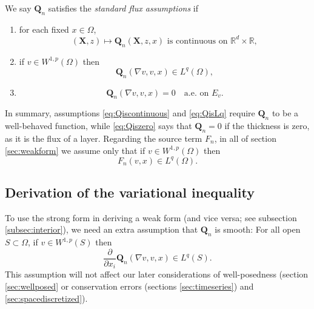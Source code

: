 \documentclass[final,leqno,onefignum,onetabnum]{siamltex1213bueler}
\newcommand\bQ{\mathbf{Q}}
\newcommand\bX{\mathbf{X}}
\renewcommand{\grad}{\nabla}
\newcommand\RR{\mathbb{R}}
\begin{document}
\begin{definition}  \label{ass:std}  We say $\bQ_n$ satisfies the \emph{standard flux assumptions} if
\renewcommand{\labelenumi}{\emph{\roman{enumi}})}
\begin{enumerate}
\item for each fixed $x\in \Omega$,
\begin{equation}
(\bX,z) \mapsto \bQ_n(\bX,z,x) \text{ is continuous on } \RR^d \times \RR,  \label{eq:Qiscontinuous}
\end{equation}
\item if $v \in W^{1,p}(\Omega)$ then
\begin{equation}
\bQ_n(\grad v,v,x) \in L^q(\Omega), \label{eq:QisLq}
\end{equation}
\item
\begin{equation}
\bQ_n(\grad v,v,x)=0 \quad \text{a.e.~on } E_v. \label{eq:Qiszero}
\end{equation}
\end{enumerate}
\end{definition}

In summary, assumptions \eqref{eq:Qiscontinuous} and \eqref{eq:QisLq} require $\bQ_n$ to be a well-behaved function, while \eqref{eq:Qiszero} says that $\bQ_n=0$ if the thickness is zero, as it is the flux of a layer.  Regarding the source term $F_n$, in all of section \ref{sec:weakform} we assume only that if $v\in W^{1,p}(\Omega)$ then
\begin{equation}
F_n(v,x) \in L^q(\Omega).  \label{eq:FisLq}
\end{equation}

\subsection{Derivation of the variational inequality}  \label{subsec:derivevi}  To use the strong form in deriving a weak form (and vice versa; see subsection \ref{subsec:interior}), we need an extra assumption that $\bQ_n$ is smooth:  For all open $S \subset \Omega$, if $v\in W^{1,p}(S)$ then
\begin{equation}
\frac{\partial}{\partial x_i} \bQ_n(\grad v,v,x) \in L^q(S). \label{eq:Qissmooth}
\end{equation}
This assumption will not affect our later considerations of well-posedness (section \ref{sec:wellposed} or conservation errors (sections \ref{sec:timeseries}) and \ref{sec:spacediscretized}).
\end{document}
